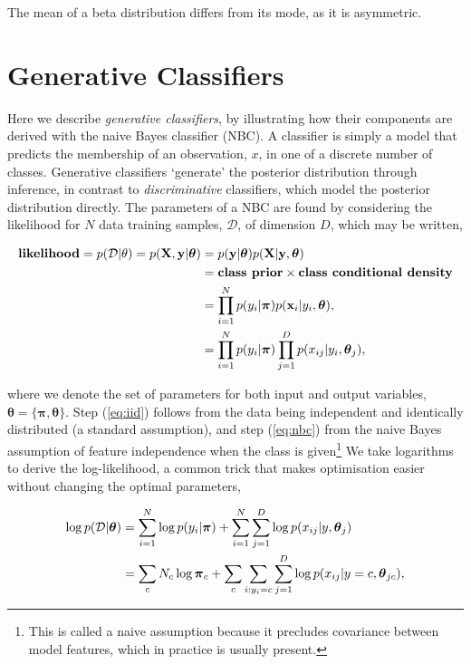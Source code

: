 \documentclass[11pt]{amsart}
\begin{document}
The mean of a beta distribution differs from its mode, as it is asymmetric.

\section{Generative Classifiers}

Here we describe \emph{generative classifiers}, by illustrating how their components are derived with the naive Bayes classifier (NBC). A classifier is simply a model that predicts the membership of an observation, $x$, in one of a discrete number of classes. Generative classifiers `generate' the posterior distribution through inference, in contrast to \emph{discriminative} classifiers, which model the posterior distribution directly. The parameters of a NBC are found by considering the likelihood for $N$ data training samples, $\mathcal{D}$, of dimension $D$, which may be written,

\begin{align}
\textbf{likelihood} = p(\mathcal{D}|\theta) = p(\mathbf{X}, \mathbf{y}|\boldsymbol\theta) &= p(\mathbf{y}|\boldsymbol\theta)p(\mathbf{X}|\mathbf{y},\boldsymbol\theta) \notag \\
&= \textbf{class prior} \times \textbf{class conditional density} \notag \\
&= \prod_{i=1}^N p(y_i|\boldsymbol\pi)p(\mathbf{x}_i|y_i,\boldsymbol\theta), \label{eq:iid} \\
&= \prod_{i=1}^N p(y_i|\boldsymbol\pi)\prod_{j = 1}^D p(x_{ij}|y_i,\boldsymbol\theta_j), \label{eq:nbc}
\end{align}

where we denote the set of parameters for both input and output variables, $\boldsymbol\theta = \{\boldsymbol\pi, \boldsymbol\theta\}$. Step (\ref{eq:iid}) follows from the data being independent and identically distributed (a standard assumption), and step (\ref{eq:nbc}) from the naive Bayes assumption of feature independence when the class is given\footnote{This is called a naive assumption because it precludes covariance between model features, which in practice is usually present.} We take logarithms to derive the log-likelihood, a common trick that makes optimisation easier without changing the optimal parameters,

\begin{align}
\log p(\mathcal{D}|\boldsymbol\theta) &= \sum_{i=1}^N \log p(y_i|\boldsymbol\pi) + \sum_{i=1}^N\sum_{j = 1}^D\log p(x_{ij}|y,\boldsymbol\theta_j) \notag \\
&= \sum_{c} N_c\log \boldsymbol\pi_c + \sum_{c}\sum_{i:y_i=c}\sum_{j = 1}^D\log p(x_{ij}|y=c,\boldsymbol\theta_{jc}), \notag
\end{align}
\end{document}
